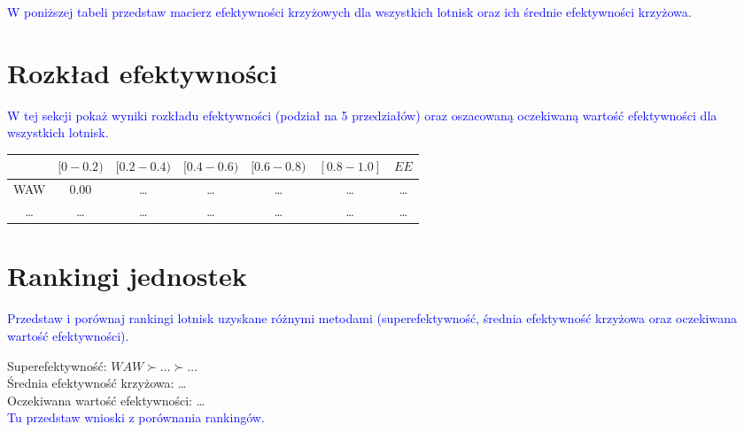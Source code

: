 \documentclass[a4paper,12pt]{article}
\begin{document}
\textcolor{blue}{W poniższej tabeli przedstaw macierz efektywności krzyżowych dla wszystkich lotnisk oraz ich średnie efektywności krzyżowa.}    

\begin{table}[H]
\label{tab:airports-cross-efficiency}
\end{table}
            
\section{Rozkład efektywności}
\textcolor{blue}{W tej sekcji pokaż wyniki rozkładu efektywności (podział na 5 przedziałów) oraz oszacowaną oczekiwaną wartość efektywności dla wszystkich lotnisk.}
\begin{table}[H]
\begin{tabular}{c|ccccc|c}
\hline
    & $[0-0.2)$ & $[0.2-0.4)$ & $[0.4-0.6)$ & $[0.6-0.8)$ & $[0.8-1.0]$ & $EE$    \\ \hline
WAW & 0.00      & \ldots & \ldots & \ldots & \ldots & \ldots \\
\ldots & \ldots & \ldots & \ldots & \ldots & \ldots & \ldots \\
\hline
\end{tabular}
\label{tab:efficiency-distribution}
\end{table}

\section{Rankingi jednostek}
\textcolor{blue}{Przedstaw i porównaj rankingi lotnisk uzyskane różnymi metodami (superefektywność, średnia efektywność krzyżowa oraz oczekiwana wartość efektywności).}

\noindent Superefektywność: $WAW \succ \ldots \succ \ldots$ \\
Średnia efektywność krzyżowa: \ldots \\
Oczekiwana wartość efektywności: \ldots \\

\textcolor{blue}{Tu przedstaw wnioski z porównania rankingów.}
\end{document}
